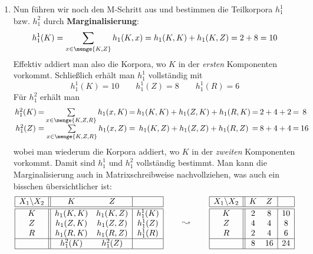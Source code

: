 \documentclass[ngerman, a4paper, 12pt]{article}
\newcommand{\begriff}[1]{\textbf{#1}}
\begin{document}
\begin{enumerate}[label=(\alph*), leftmargin=0pt]
	\item
	Nun führen wir noch den M-Schritt aus und bestimmen die Teilkorpora $h_1^1$ bzw. $h_1^2$ durch \begriff{Marginalisierung}:
	\begin{equation*}
		h_1^1(K) 
		= \sum_{x \in \menge{K,Z}} h_1(K,x) 
		= h_1(K,K) + h_1(K,Z)
		= 2 + 8
		= 10
	\end{equation*}
	Effektiv addiert man also die Korpora, wo $K$ in der \textit{ersten} Komponenten vorkommt. Schließlich erhält man $h_1^1$ vollständig mit
	\begin{equation*}
		h_1^1(K) = 10 \qquad h_1^1(Z) = 8 \qquad h_1^1(R) = 6
	\end{equation*}
	Für $h_1^2$ erhält man
	\begin{equation*}
	\setlength{\arraycolsep}{1pt}
	\begin{array}{ccccccccc}
		h_1^2(K) 
		&=& \sum\limits_{x \in \menge{K,Z,R}} h_1(x,K) 
		&=& h_1(K,K) + h_1(Z,K) + h_1(R,K)
		&=& 2 + 4 + 2
		&=& 8 \\
		h_1^2(Z)
		&=& \sum\limits_{x \in \menge{K,Z,R}} h_1(x,Z)
		&=& h_1(K,Z) + h_1(Z,Z) + h_1(R,Z)
		&=& 8 + 4 + 4
		&=& 16
	\end{array}
	\end{equation*}
	wobei man wiederum die Korpora addiert, wo $K$ in der \textit{zweiten} Komponenten vorkommt.
	Damit sind $h_1^1$ und $h_1^2$ vollständig bestimmt. 
	Man kann die Marginalisierung auch in Matrixschreibweise nachvollziehen, was auch ein bisschen übersichtlicher ist:
	\begin{equation*}
		\begin{array}{|c||cc|c|}
		\hline
		X_1 \backslash X_2 & K & Z & \\ \hline \hline
		K & h_1(K,K) & h_1(K,Z) & h_1^1(K) \\
		Z & h_1(Z,K) & h_1(Z,Z) & h_1^1(Z) \\
		R & h_1(R,K) & h_1(R,Z) & h_1^1(R) \\ \hline
		  & h_1^2(K) & h_1^2(Z) & \\ \hline
		\end{array}
		\qquad \leadsto \qquad 
		\begin{array}{|c||cc|c|}
		\hline
		X_1 \backslash X_2 & K & Z & \\ \hline \hline
		K & 2 &  8 & 10 \\
		Z & 4 &  4 &  8 \\
		R & 2 &  4 &  6 \\ \hline
	      & 8 & 16 & 24 \\ \hline
		\end{array}
	\end{equation*}


\end{enumerate}
\end{document}
